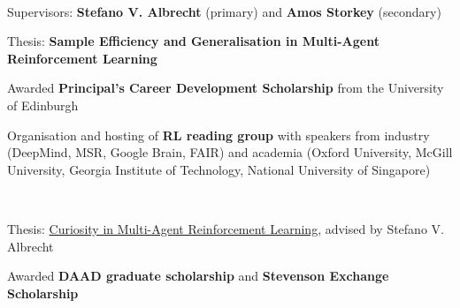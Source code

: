 \documentclass[]{lukas-cv-openfont}
\begin{document}
\noindent
{}
\\
\begin{tightitemize}{1.7em}
    \item Supervisors: \textbf{Stefano V. Albrecht} (primary) and \textbf{Amos Storkey} (secondary)
    \item Thesis: \textbf{Sample Efficiency and Generalisation in Multi-Agent Reinforcement Learning}
    \item Awarded \textbf{Principal's Career Development Scholarship} from the University of Edinburgh
    \item Organisation and hosting of \textbf{RL reading group} with speakers from industry (DeepMind, MSR, Google Brain, FAIR) and academia (Oxford University, McGill University, Georgia Institute of Technology, National University of Singapore)

\end{tightitemize}
\sectionsep

\noindent
{}
\\
\begin{tightitemize}{1.7em}
    \item Thesis: \href{https://www.lukaschaefer.com/assets/files/msc_thesis.pdf}{Curiosity in Multi-Agent Reinforcement Learning}, advised by Stefano V. Albrecht
    \item Awarded \textbf{DAAD graduate scholarship} and \textbf{Stevenson Exchange Scholarship} 
\end{tightitemize}
\sectionsep
\end{document}
